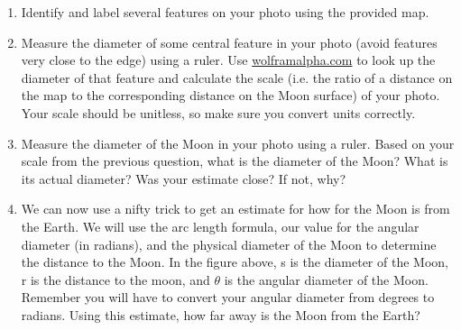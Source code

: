 \documentclass[12pt]{article}%
\begin{document}
\begin{enumerate}

    \item Identify and label several features on your photo using the provided map.
    
    \item Measure the diameter of some central feature in your photo (avoid features very close to the edge) using a ruler. Use \url{wolframalpha.com} to look up the diameter of that feature and calculate the scale (i.e. the ratio of a distance on the map to the corresponding distance on the Moon surface) of your photo. Your scale should be unitless, so make sure you convert units correctly. 
    
    \item Measure the diameter of the Moon in your photo using a ruler. Based on your scale from the previous question, what is the diameter of the Moon? What is its actual diameter? Was your estimate close? If not, why?
    
    \item We can now use a nifty trick to get an estimate for how for the Moon is from the Earth. We will use the arc length formula, our value for the angular diameter (in radians), and the physical diameter of the Moon to determine the distance to the Moon. In the figure above, s is the diameter of the Moon, r is the distance to the moon, and $\theta$ is the angular diameter of the Moon. Remember you will have to convert your angular diameter from degrees to radians. Using this estimate, how far away is the Moon from the Earth? 
    


\end{enumerate}

\vspace{4cm}
\end{document}
